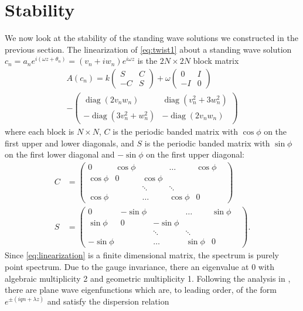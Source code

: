 \documentclass[12pt]{article}
\DeclareMathOperator{\diag}{diag}
\begin{document}
\section{Stability}

We now look at the stability of the standing wave solutions we constructed in the previous section. The linearization of \cref{eq:twist1} about a standing wave solution $c_n = a_n e^{i (\omega z + \theta_n) } = (v_n + i w_n)e^{i\omega z}$ is the $2N \times 2N$ block matrix
\begin{align}\label{eq:linearization}
A(c_n) =
k \begin{pmatrix}S & C \\ -C & S \end{pmatrix}
+ \omega\begin{pmatrix}0 & I \\ -I & 0 \end{pmatrix} \\
- \begin{pmatrix} \diag(2v_n w_n) & \diag(v_n^2 + 3 w_n^2) \\
-\diag(3 v_n^2 + w_n^2) & -\diag(2v_n w_n) \end{pmatrix}
\end{align}
where each block is $N\times N$, $C$ is the periodic banded matrix with $\cos \phi$ on the first upper and lower diagonals, and $S$ is the periodic banded matrix with $\sin \phi$ on the first lower diagonal and $-\sin \phi$ on the first upper diagonal:
\begin{align*}
C &= \begin{pmatrix}
0 & \cos \phi & & \dots & \cos \phi \\
\cos \phi & 0 & \cos \phi & & & \\
& & \ddots & \ddots &  & \\
\cos \phi & & \dots & \cos \phi & 0
\end{pmatrix} \\
S &= \begin{pmatrix}
0 & -\sin \phi & & \dots & \sin \phi \\
\sin \phi & 0 & -\sin \phi & & & \\
& & \ddots & \ddots &  & \\
-\sin \phi & & \dots & \sin \phi & 0
\end{pmatrix}.
\end{align*}
Since \cref{eq:linearization} is a finite dimensional matrix, the spectrum is purely point spectrum. Due to the gauge invariance, there an eigenvalue at 0 with algebraic multiplicity 2 and geometric multiplicity 1. Following the analysis in \cite[Section 2.1.1.1]{Kevrekidis2009}, there are plane wave eigenfunctions which are, to leading order, of the form $e^{\pm( i q n + \lambda z)}$ and satisfy the dispersion relation
\end{document}

